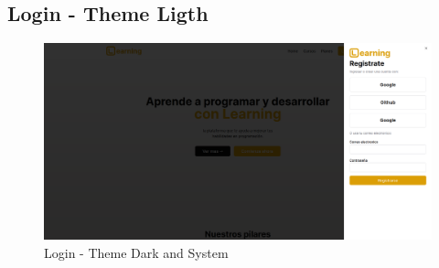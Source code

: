 \subsection{Login - Theme Ligth}
  \begin{figure}[H]
    \centering
    \includegraphics[width=1.0\textwidth]{img/L-L.png}
    \caption{Login - Theme Dark and System}
  \end{figure}










